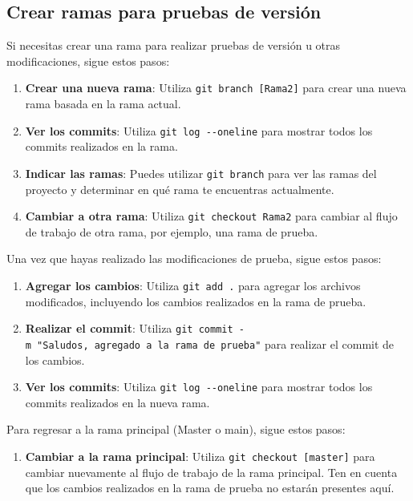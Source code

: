 \documentclass[
  letterpaper,
  DIV=11,
  numbers=noendperiod]{scrartcl}
\providecommand{\tightlist}{%
  \setlength{\itemsep}{0pt}\setlength{\parskip}{0pt}}\usepackage{longtable,booktabs,array}
\begin{document}
\hypertarget{crear-ramas-para-pruebas-de-versiuxf3n}{%
\subsection{Crear ramas para pruebas de
versión}\label{crear-ramas-para-pruebas-de-versiuxf3n}}

Si necesitas crear una rama para realizar pruebas de versión u otras
modificaciones, sigue estos pasos:

\begin{enumerate}
\def\labelenumi{\arabic{enumi}.}
\item
  \textbf{Crear una nueva rama}: Utiliza
  \texttt{git\ branch\ {[}Rama2{]}} para crear una nueva rama basada en
  la rama actual.
\item
  \textbf{Ver los commits}: Utiliza \texttt{git\ log\ -\/-oneline} para
  mostrar todos los commits realizados en la rama.
\item
  \textbf{Indicar las ramas}: Puedes utilizar \texttt{git\ branch} para
  ver las ramas del proyecto y determinar en qué rama te encuentras
  actualmente.
\item
  \textbf{Cambiar a otra rama}: Utiliza \texttt{git\ checkout\ Rama2}
  para cambiar al flujo de trabajo de otra rama, por ejemplo, una rama
  de prueba.
\end{enumerate}

Una vez que hayas realizado las modificaciones de prueba, sigue estos
pasos:

\begin{enumerate}
\def\labelenumi{\arabic{enumi}.}
\setcounter{enumi}{4}
\item
  \textbf{Agregar los cambios}: Utiliza \texttt{git\ add\ .} para
  agregar los archivos modificados, incluyendo los cambios realizados en
  la rama de prueba.
\item
  \textbf{Realizar el commit}: Utiliza
  \texttt{git\ commit\ -m\ "Saludos,\ agregado\ a\ la\ rama\ de\ prueba"}
  para realizar el commit de los cambios.
\item
  \textbf{Ver los commits}: Utiliza \texttt{git\ log\ -\/-oneline} para
  mostrar todos los commits realizados en la nueva rama.
\end{enumerate}

Para regresar a la rama principal (Master o main), sigue estos pasos:

\begin{enumerate}
\def\labelenumi{\arabic{enumi}.}
\tightlist
\item
  \textbf{Cambiar a la rama principal}: Utiliza
  \texttt{git\ checkout\ {[}master{]}} para cambiar nuevamente al flujo
  de trabajo de la rama principal. Ten en cuenta que los cambios
  realizados en la rama de prueba no estarán presentes aquí.
\end{enumerate}
\end{document}
